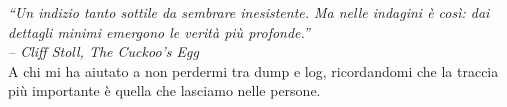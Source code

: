 \begin{dedication}
    \begin{flushright}
        {\small\itshape
        “Un indizio tanto sottile da sembrare inesistente. Ma nelle indagini è così: dai dettagli minimi emergono le verità più profonde.”\\
        -- Cliff Stoll, The Cuckoo’s Egg
        \\[1em]
        }
        \footnotesize
        A chi mi ha aiutato a non perdermi tra dump e log, ricordandomi che la traccia più importante è quella che lasciamo nelle persone.
    \end{flushright}
\end{dedication}
